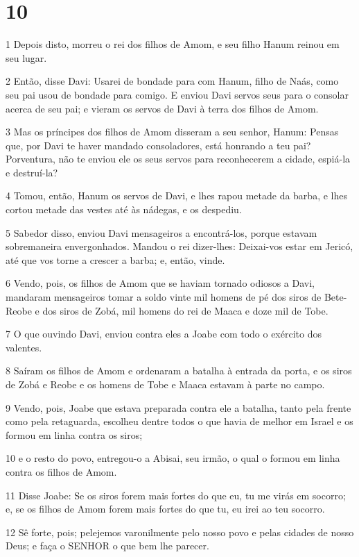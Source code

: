 \chapter{10}

\par 1 Depois disto, morreu o rei dos filhos de Amom, e seu filho Hanum reinou em seu lugar.
\par 2 Então, disse Davi: Usarei de bondade para com Hanum, filho de Naás, como seu pai usou de bondade para comigo. E enviou Davi servos seus para o consolar acerca de seu pai; e vieram os servos de Davi à terra dos filhos de Amom.
\par 3 Mas os príncipes dos filhos de Amom disseram a seu senhor, Hanum: Pensas que, por Davi te haver mandado consoladores, está honrando a teu pai? Porventura, não te enviou ele os seus servos para reconhecerem a cidade, espiá-la e destruí-la?
\par 4 Tomou, então, Hanum os servos de Davi, e lhes rapou metade da barba, e lhes cortou metade das vestes até às nádegas, e os despediu.
\par 5 Sabedor disso, enviou Davi mensageiros a encontrá-los, porque estavam sobremaneira envergonhados. Mandou o rei dizer-lhes: Deixai-vos estar em Jericó, até que vos torne a crescer a barba; e, então, vinde.
\par 6 Vendo, pois, os filhos de Amom que se haviam tornado odiosos a Davi, mandaram mensageiros tomar a soldo vinte mil homens de pé dos siros de Bete-Reobe e dos siros de Zobá, mil homens do rei de Maaca e doze mil de Tobe.
\par 7 O que ouvindo Davi, enviou contra eles a Joabe com todo o exército dos valentes.
\par 8 Saíram os filhos de Amom e ordenaram a batalha à entrada da porta, e os siros de Zobá e Reobe e os homens de Tobe e Maaca estavam à parte no campo.
\par 9 Vendo, pois, Joabe que estava preparada contra ele a batalha, tanto pela frente como pela retaguarda, escolheu dentre todos o que havia de melhor em Israel e os formou em linha contra os siros;
\par 10 e o resto do povo, entregou-o a Abisai, seu irmão, o qual o formou em linha contra os filhos de Amom.
\par 11 Disse Joabe: Se os siros forem mais fortes do que eu, tu me virás em socorro; e, se os filhos de Amom forem mais fortes do que tu, eu irei ao teu socorro.
\par 12 Sê forte, pois; pelejemos varonilmente pelo nosso povo e pelas cidades de nosso Deus; e faça o SENHOR o que bem lhe parecer.
